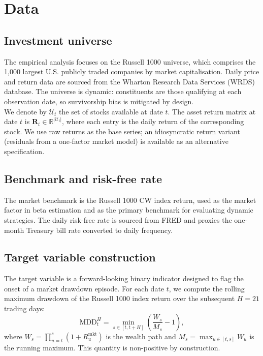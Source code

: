 \documentclass{article}
\begin{document}
\section{Data}
\label{sec:data}

\subsection{Investment universe}

The empirical analysis focuses on the Russell 1000 universe, which comprises the 1,000 largest U.S. publicly traded companies by market capitalisation. Daily price and return data are sourced from the Wharton Research Data Services (WRDS) database. The universe is dynamic: constituents are those qualifying at each observation date, so survivorship bias is mitigated by design.\\

We denote by $\mathcal{U}_t$ the set of stocks available at date $t$. The asset return matrix at date $t$ is $\mathbf{R}_t \in \mathbb{R}^{|\mathcal{U}_t|}$, where each entry is the daily return of the corresponding stock. We use raw returns as the base series; an idiosyncratic return variant (residuals from a one-factor market model) is available as an alternative specification.

\subsection{Benchmark and risk-free rate}

The market benchmark is the Russell 1000 CW index return, used as the market factor in beta estimation and as the primary benchmark for evaluating dynamic strategies. The daily risk-free rate is sourced from FRED and proxies the one-month Treasury bill rate converted to daily frequency.

\subsection{Target variable construction}
\label{sec:target}

The target variable is a forward-looking binary indicator designed to flag the onset of a market drawdown episode. For each date $t$, we compute the rolling maximum drawdown of the Russell 1000 index return over the subsequent $H = 21$ trading days:
\begin{equation}
    \text{MDD}_{t}^{H} = \min_{s \in [t, t+H]} \left( \frac{W_s}{M_s} - 1 \right),
\end{equation}
where $W_s = \prod_{u=t}^{s}(1 + R_u^{\text{mkt}})$ is the wealth path and $M_s = \max_{u \in [t,s]} W_u$ is the running maximum. This quantity is non-positive by construction.\\
\end{document}
